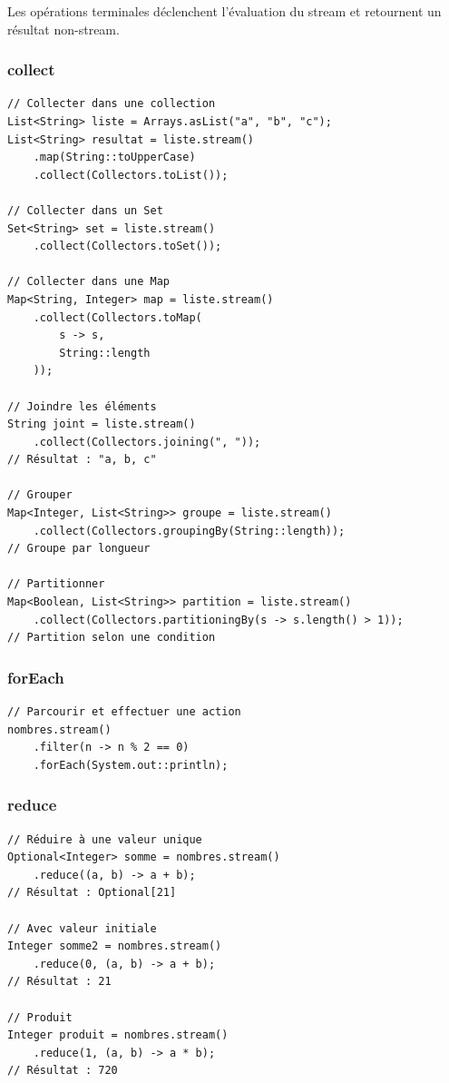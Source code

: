 \documentclass[11pt,a4paper]{article}
\begin{document}
Les opérations terminales déclenchent l'évaluation du stream et retournent un résultat non-stream.

\subsubsection{collect}

\begin{lstlisting}
// Collecter dans une collection
List<String> liste = Arrays.asList("a", "b", "c");
List<String> resultat = liste.stream()
    .map(String::toUpperCase)
    .collect(Collectors.toList());

// Collecter dans un Set
Set<String> set = liste.stream()
    .collect(Collectors.toSet());

// Collecter dans une Map
Map<String, Integer> map = liste.stream()
    .collect(Collectors.toMap(
        s -> s,
        String::length
    ));

// Joindre les éléments
String joint = liste.stream()
    .collect(Collectors.joining(", "));
// Résultat : "a, b, c"

// Grouper
Map<Integer, List<String>> groupe = liste.stream()
    .collect(Collectors.groupingBy(String::length));
// Groupe par longueur

// Partitionner
Map<Boolean, List<String>> partition = liste.stream()
    .collect(Collectors.partitioningBy(s -> s.length() > 1));
// Partition selon une condition
\end{lstlisting}

\subsubsection{forEach}

\begin{lstlisting}
// Parcourir et effectuer une action
nombres.stream()
    .filter(n -> n % 2 == 0)
    .forEach(System.out::println);
\end{lstlisting}

\subsubsection{reduce}

\begin{lstlisting}
// Réduire à une valeur unique
Optional<Integer> somme = nombres.stream()
    .reduce((a, b) -> a + b);
// Résultat : Optional[21]

// Avec valeur initiale
Integer somme2 = nombres.stream()
    .reduce(0, (a, b) -> a + b);
// Résultat : 21

// Produit
Integer produit = nombres.stream()
    .reduce(1, (a, b) -> a * b);
// Résultat : 720
\end{lstlisting}
\end{document}
